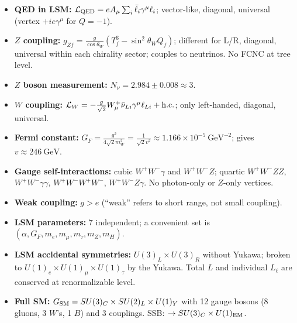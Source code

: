 \begin{itemize}
  \item \textbf{QED in LSM:} $\mathcal{L}_{\mathrm{QED}} = eA_\mu\sum_i\bar\ell_i\gamma^\mu\ell_i$;
        vector-like, diagonal, universal (vertex $+ie\gamma^\mu$ for $Q=-1$).
  \item \textbf{$Z$ coupling:} $g_{Zf} = \frac{g}{\cos\theta_W}(T^3_f - \sin^2\theta_W Q_f)$;
        different for L/R, diagonal, universal within each chirality sector;
        couples to neutrinos. No FCNC at tree level.
  \item \textbf{$Z$ boson measurement:} $N_\nu = 2.984\pm0.008\approx3$.
  \item \textbf{$W$ coupling:} $\mathcal{L}_W = -\frac{g}{\sqrt2}W^+_\mu\bar\nu_{Li}
        \gamma^\mu\ell_{Li} + \mathrm{h.c.}$; only left-handed, diagonal, universal.
  \item \textbf{Fermi constant:} $G_F = \frac{g^2}{4\sqrt2 m_W^2} = \frac{1}{\sqrt2 v^2}
        \approx 1.166\times10^{-5}\ \mathrm{GeV}^{-2}$; gives $v\approx246\ \mathrm{GeV}$.
  \item \textbf{Gauge self-interactions:} cubic $W^+W^-\gamma$ and $W^+W^-Z$;
        quartic $W^+W^-ZZ$, $W^+W^-\gamma\gamma$, $W^+W^-W^+W^-$, $W^+W^-Z\gamma$.
        No photon-only or $Z$-only vertices.
  \item \textbf{Weak coupling:} $g > e$ (``weak'' refers to short range, not small
        coupling).
  \item \textbf{LSM parameters:} 7 independent; a convenient set is
        $(\alpha, G_F, m_e, m_\mu, m_\tau, m_Z, m_H)$.
  \item \textbf{LSM accidental symmetries:} $U(3)_L\times U(3)_R$ without
        Yukawa; broken to $U(1)_e\times U(1)_\mu\times U(1)_\tau$ by the
        Yukawa. Total $L$ and individual $L_\ell$ are conserved at
        renormalizable level.
  \item \textbf{Full SM:} $G_{\rm SM} = SU(3)_C\times SU(2)_L\times U(1)_Y$
        with 12 gauge bosons (8 gluons, 3 $W$'s, 1 $B$) and 3 couplings.
        SSB: $\to SU(3)_C\times U(1)_{\rm EM}$.
\end{itemize}

